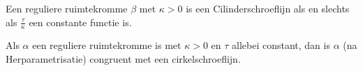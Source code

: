 \documentclass[main.tex]{subfiles}
\begin{document}
\begin{st}
  Een reguliere ruimtekromme $\beta$ met $\kappa>0$ is een Cilinderschroeflijn als en slechts als $\frac{\tau}{\kappa}$ een constante functie is.
\end{st}

\begin{st}
  Als $\alpha$ een reguliere ruimtekromme is met $\kappa>0$ en $\tau$ allebei constant, dan is $\alpha$ (na Herparametrisatie) congruent met een cirkelschroeflijn.
\end{st}
\end{document}
